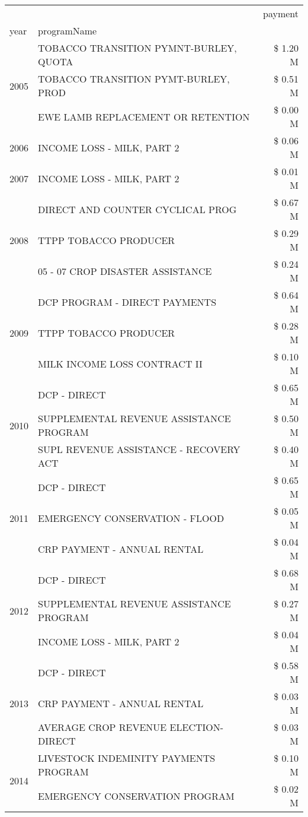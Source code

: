 \begin{tabular}{llr}
\toprule
 &  & payment \\
year & programName &  \\
\midrule
\multirow[t]{3}{*}{2005} & TOBACCO TRANSITION PYMNT-BURLEY, QUOTA & \$ 1.20 M \\
 & TOBACCO TRANSITION PYMT-BURLEY, PROD & \$ 0.51 M \\
 & EWE LAMB REPLACEMENT OR RETENTION & \$ 0.00 M \\
\cline{1-3}
2006 & INCOME LOSS - MILK, PART 2 & \$ 0.06 M \\
\cline{1-3}
2007 & INCOME LOSS - MILK, PART 2 & \$ 0.01 M \\
\cline{1-3}
\multirow[t]{3}{*}{2008} & DIRECT AND COUNTER CYCLICAL PROG & \$ 0.67 M \\
 & TTPP TOBACCO PRODUCER & \$ 0.29 M \\
 & 05 - 07 CROP DISASTER ASSISTANCE & \$ 0.24 M \\
\cline{1-3}
\multirow[t]{3}{*}{2009} & DCP PROGRAM - DIRECT PAYMENTS & \$ 0.64 M \\
 & TTPP TOBACCO PRODUCER & \$ 0.28 M \\
 & MILK INCOME LOSS CONTRACT II & \$ 0.10 M \\
\cline{1-3}
\multirow[t]{3}{*}{2010} & DCP - DIRECT & \$ 0.65 M \\
 & SUPPLEMENTAL REVENUE ASSISTANCE PROGRAM & \$ 0.50 M \\
 & SUPL REVENUE ASSISTANCE - RECOVERY ACT & \$ 0.40 M \\
\cline{1-3}
\multirow[t]{3}{*}{2011} & DCP - DIRECT & \$ 0.65 M \\
 & EMERGENCY CONSERVATION - FLOOD & \$ 0.05 M \\
 & CRP PAYMENT - ANNUAL RENTAL & \$ 0.04 M \\
\cline{1-3}
\multirow[t]{3}{*}{2012} & DCP - DIRECT & \$ 0.68 M \\
 & SUPPLEMENTAL REVENUE ASSISTANCE PROGRAM & \$ 0.27 M \\
 & INCOME LOSS - MILK, PART 2 & \$ 0.04 M \\
\cline{1-3}
\multirow[t]{3}{*}{2013} & DCP - DIRECT & \$ 0.58 M \\
 & CRP PAYMENT - ANNUAL RENTAL & \$ 0.03 M \\
 & AVERAGE CROP REVENUE ELECTION-DIRECT & \$ 0.03 M \\
\cline{1-3}
\multirow[t]{3}{*}{2014} & LIVESTOCK INDEMINITY PAYMENTS PROGRAM & \$ 0.10 M \\
 & EMERGENCY CONSERVATION PROGRAM & \$ 0.02 M \\

\end{tabular}
